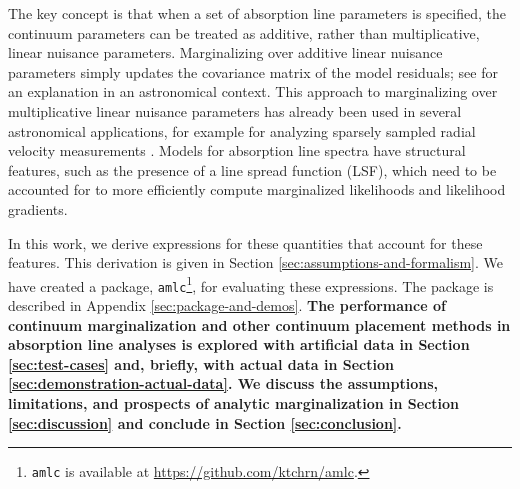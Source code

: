 \documentclass[manuscript]{aastex62}
\newcommand{\pkgname}{\texttt{amlc}}
\begin{document}
The key concept is that when a set of absorption line parameters is specified, the continuum parameters can be treated as additive, rather than multiplicative, linear nuisance parameters.
Marginalizing over additive linear nuisance parameters simply updates the covariance matrix of the model residuals; see \citet{2017RNAAS...1a...7L} for an explanation in an astronomical context.
This approach to marginalizing over multiplicative linear nuisance parameters has already been used in several astronomical applications, for example for analyzing sparsely sampled radial velocity measurements \citep{2017ApJ...837...20P}.
Models for absorption line spectra have structural features, such as the presence of a line spread function (LSF), which need to be accounted for to more efficiently compute marginalized likelihoods and likelihood gradients.

In this work, we derive expressions for these quantities that account for these features.
This derivation is given in Section \ref{sec:assumptions-and-formalism}.
We have created a package, \pkgname\footnote{\pkgname{} is available at \url{https://github.com/ktchrn/amlc}.}, for evaluating these expressions.
The package is described in Appendix \ref{sec:package-and-demos}.
{\bf
The performance of continuum marginalization and other continuum placement methods in absorption line analyses is explored with artificial data in Section \ref{sec:test-cases} and, briefly, with actual data in Section \ref{sec:demonstration-actual-data}.
We discuss the assumptions, limitations, and prospects of analytic marginalization in Section \ref{sec:discussion} and conclude in Section \ref{sec:conclusion}.
}
\end{document}
